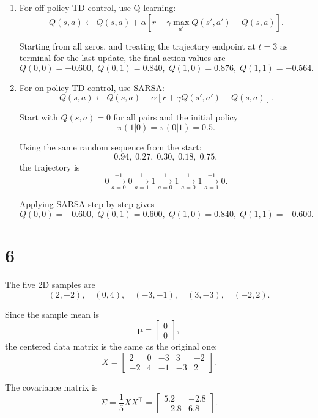 \documentclass[11pt]{article}
\begin{document}
\begin{enumerate}[label=\alph*)]
Using every-visit incremental Monte Carlo with \(\alpha=0.6\) and initial estimates \(0\):
\[
\boxed{V(0)\approx 0.77856,\qquad V(1)\approx -0.22560.}
\]

The action-value estimates are
\[
\boxed{
Q(0,0)=-0.534,\;
Q(0,1)=0.864,\;
Q(1,0)=0.786,\;
Q(1,1)=-0.540.}
\]

\item For off-policy TD control, use Q-learning:
\[
Q(s,a)\leftarrow Q(s,a)+\alpha\left[r+\gamma\max_{a'}Q(s',a')-Q(s,a)\right].
\]

Starting from all zeros, and treating the trajectory endpoint at \(t=3\) as terminal for the
last update, the final action values are
\[
\boxed{
Q(0,0)=-0.600,\;
Q(0,1)=0.840,\;
Q(1,0)=0.876,\;
Q(1,1)=-0.564.}
\]

\item For on-policy TD control, use SARSA:
\[
Q(s,a)\leftarrow Q(s,a)+\alpha\left[r+\gamma Q(s',a')-Q(s,a)\right].
\]

Start with \(Q(s,a)=0\) for all pairs and the initial policy
\[
\pi(1|0)=\pi(0|1)=0.5.
\]

Using the same random sequence from the start:
\[
0.94,\;0.27,\;0.30,\;0.18,\;0.75,
\]
the trajectory is
\[
0 \xrightarrow[a=0]{-1} 0 \xrightarrow[a=1]{1} 1 \xrightarrow[a=0]{1} 1
\xrightarrow[a=0]{1} 1 \xrightarrow[a=1]{-1} 0.
\]

Applying SARSA step-by-step gives
\[
\boxed{
Q(0,0)=-0.600,\;
Q(0,1)=0.600,\;
Q(1,0)=0.840,\;
Q(1,1)=-0.600.}
\]
\end{enumerate}

\section*{6}

The five 2D samples are
\[
(2,-2),\quad (0,4),\quad (-3,-1),\quad (3,-3),\quad (-2,2).
\]

Since the sample mean is
\[
\bm{\mu}=
\begin{bmatrix}
0\\
0
\end{bmatrix},
\]
the centered data matrix is the same as the original one:
\[
X=
\begin{bmatrix}
2 & 0 & -3 & 3 & -2\\
-2 & 4 & -1 & -3 & 2
\end{bmatrix}.
\]

The covariance matrix is
\[
\Sigma=\frac{1}{5}XX^{\top}
=
\begin{bmatrix}
5.2 & -2.8\\
-2.8 & 6.8
\end{bmatrix}.
\]
\end{document}
